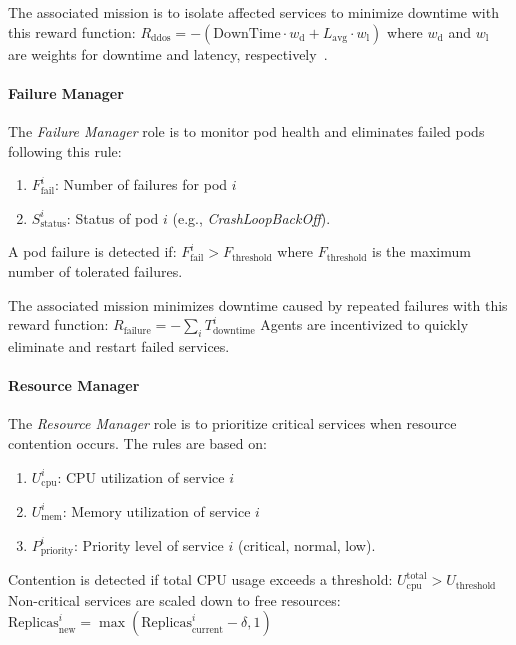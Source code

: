 The associated mission is to isolate affected services to minimize downtime with this reward function:
$R_{\text{ddos}} = - \left( \text{DownTime} \cdot w_{\text{d}} + L_{\text{avg}} \cdot w_{\text{l}} \right)$
where \( w_{\text{d}} \) and \( w_{\text{l}} \) are weights for downtime and latency, respectively~\cite{Liu2018}.

\noindent \paragraph{\textbf{Failure Manager}}

The \textit{Failure Manager} role is to monitor pod health and eliminates failed pods following this rule:
\begin{enumerate}[label={}, itemjoin={;\quad }]
    \item \( F_{\text{fail}}^i \): Number of failures for pod \( i \)
    \item \( S_{\text{status}}^i \): Status of pod \( i \) (e.g., \textit{CrashLoopBackOff}).
\end{enumerate}
A pod failure is detected if:
$F_{\text{fail}}^i > F_{\text{threshold}}$
where \( F_{\text{threshold}} \) is the maximum number of tolerated failures.

The associated mission minimizes downtime caused by repeated failures with this reward function:
$R_{\text{failure}} = - \sum_{i} T_{\text{downtime}}^i$
Agents are incentivized to quickly eliminate and restart failed services.

\noindent \paragraph{\textbf{Resource Manager}}

The \textit{Resource Manager} role is to prioritize critical services when resource contention occurs. The rules are based on:
\begin{enumerate}[label={}, itemjoin={;\quad }]
    \item \( U_{\text{cpu}}^i \): CPU utilization of service \( i \)
    \item \( U_{\text{mem}}^i \): Memory utilization of service \( i \)
    \item \( P_{\text{priority}}^i \): Priority level of service \( i \) (critical, normal, low).
\end{enumerate}
Contention is detected if total CPU usage exceeds a threshold:
$U_{\text{cpu}}^{\text{total}} > U_{\text{threshold}}$
Non-critical services are scaled down to free resources:
$\text{Replicas}_{\text{new}}^i = \max\left( \text{Replicas}_{\text{current}}^i - \delta, 1 \right)$

